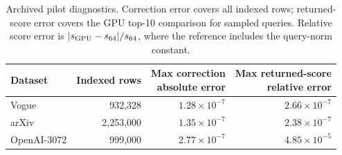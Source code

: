 \begin{table}[tbp]
\centering
\caption[Archived pilot diagnostics]{Archived pilot diagnostics. Correction error covers all indexed
rows; returned-score error covers the GPU top-10 comparison for sampled
queries. Relative score error is $|s_{\rm GPU}-s_{64}|/s_{64}$, where the
reference includes the query-norm constant.}
\label{tab:4-pilot}
\small\setlength{\tabcolsep}{4pt}
\begin{tabular}{@{}lrrr@{}}
\toprule
Dataset & Indexed rows & \shortstack{Max correction\\absolute error} & \shortstack{Max returned-score\\relative error} \\
\midrule
Vogue & 932,328 & $1.28\times10^{-7}$ & $2.66\times10^{-7}$ \\
arXiv & 2,253,000 & $1.35\times10^{-7}$ & $2.38\times10^{-7}$ \\
OpenAI-3072 & 999,000 & $2.77\times10^{-7}$ & $4.85\times10^{-5}$ \\
\bottomrule
\end{tabular}
\end{table}
